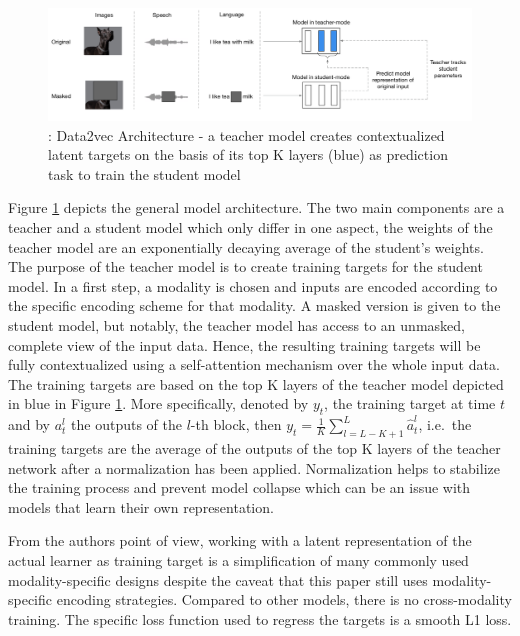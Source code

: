 \documentclass[
]{krantz}
\begin{document}
\begin{figure}

{\centering \includegraphics[width=1\linewidth]{figures/05-chapter2/datavecoverview} 

}

\caption{\citet{baevski2022data2vec}: Data2vec Architecture - a teacher model creates contextualized latent targets on the basis of its top K layers (blue) as prediction task to train the student model}\label{fig:data2vecoverview}
\end{figure}



Figure \ref{fig:data2vecoverview} depicts the general model architecture. The two main components are a teacher and a student model which only differ in one aspect, the weights of the teacher model are an exponentially decaying average of the student's weights. The purpose of the teacher model is to create training targets for the student model. In a first step, a modality is chosen and inputs are encoded according to the specific encoding scheme for that modality. A masked version is given to the student model, but notably, the teacher model has access to an unmasked, complete view of the input data. Hence, the resulting training targets will be fully contextualized using a self-attention mechanism over the whole input data. The training targets are based on the top K layers of the teacher model depicted in blue in Figure \ref{fig:data2vecoverview}. More specifically, denoted by \(y_t\), the training target at time \(t\) and by \(a_t^l\) the outputs of the \(l\)-th block, then \(y_t = \frac{1}{K}\sum_{l=L-K+1}^{L} \hat{a}_t^l\), i.e.~the training targets are the average of the outputs of the top K layers of the teacher network after a normalization has been applied. Normalization helps to stabilize the training process and prevent model collapse which can be an issue with models that learn their own representation.

From the authors point of view, working with a latent representation of the actual learner as training target is a simplification of many commonly used modality-specific designs despite the caveat that this paper still uses modality-specific encoding strategies. Compared to other models, there is no cross-modality training. The specific loss function used to regress the targets is a smooth L1 loss.
\end{document}
